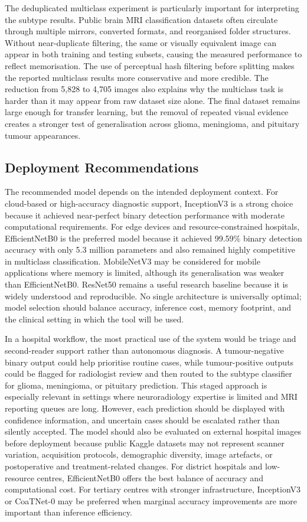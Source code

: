 \documentclass[final,3p,times,number]{elsarticle}
\begin{document}
The deduplicated multiclass experiment is particularly important for interpreting the subtype results. Public brain MRI classification datasets often circulate through multiple mirrors, converted formats, and reorganised folder structures. Without near-duplicate filtering, the same or visually equivalent image can appear in both training and testing subsets, causing the measured performance to reflect memorisation. The use of perceptual hash filtering before splitting makes the reported multiclass results more conservative and more credible. The reduction from 5,828 to 4,705 images also explains why the multiclass task is harder than it may appear from raw dataset size alone. The final dataset remains large enough for transfer learning, but the removal of repeated visual evidence creates a stronger test of generalisation across glioma, meningioma, and pituitary tumour appearances.

\subsection{Deployment Recommendations}

The recommended model depends on the intended deployment context. For cloud-based or high-accuracy diagnostic support, InceptionV3 is a strong choice because it achieved near-perfect binary detection performance with moderate computational requirements. For edge devices and resource-constrained hospitals, EfficientNetB0 is the preferred model because it achieved 99.59\% binary detection accuracy with only 5.3 million parameters and also remained highly competitive in multiclass classification. MobileNetV3 may be considered for mobile applications where memory is limited, although its generalisation was weaker than EfficientNetB0. ResNet50 remains a useful research baseline because it is widely understood and reproducible. No single architecture is universally optimal; model selection should balance accuracy, inference cost, memory footprint, and the clinical setting in which the tool will be used.

In a hospital workflow, the most practical use of the system would be triage and second-reader support rather than autonomous diagnosis. A tumour-negative binary output could help prioritise routine cases, while tumour-positive outputs could be flagged for radiologist review and then routed to the subtype classifier for glioma, meningioma, or pituitary prediction. This staged approach is especially relevant in settings where neuroradiology expertise is limited and MRI reporting queues are long. However, each prediction should be displayed with confidence information, and uncertain cases should be escalated rather than silently accepted. The model should also be evaluated on external hospital images before deployment because public Kaggle datasets may not represent scanner variation, acquisition protocols, demographic diversity, image artefacts, or postoperative and treatment-related changes. For district hospitals and low-resource centres, EfficientNetB0 offers the best balance of accuracy and computational cost. For tertiary centres with stronger infrastructure, InceptionV3 or CoaTNet-0 may be preferred when marginal accuracy improvements are more important than inference efficiency.
\end{document}
